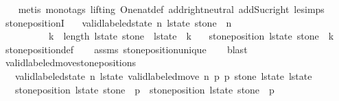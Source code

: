 \begin{isabellebody}
\ \ \isamarkupfalse%
\ {\isacharparenleft}metis\ {\isacharparenleft}mono{\isacharunderscore}tags{\isacharcomma}\ lifting{\isacharparenright}\ One{\isacharunderscore}nat{\isacharunderscore}def\ add{\isachardot}right{\isacharunderscore}neutral\ add{\isacharunderscore}Suc{\isacharunderscore}right\ le{\isacharunderscore}simps{\isacharparenleft}{}{\isacharparenright}{\isacharparenright}%
\endisatagproof
{\isafoldproof}%
%
\isadelimproof
\isanewline
%
\endisadelimproof
\isanewline
{}\isamarkupfalse%
\ stone{\isacharunderscore}positionI{\isacharcolon}\isanewline
\ \ \ {\isachardoublequoteopen}valid{\isacharunderscore}labeled{\isacharunderscore}state\ n\ l{\isacharunderscore}state{\isachardoublequoteclose}\ {\isachardoublequoteopen}stone\ {\isacharless}\ n{\isachardoublequoteclose}\ \isanewline
\ \ \ \ \ \ \ \ \ \ {\isachardoublequoteopen}k\ {\isacharless}\ length\ l{\isacharunderscore}state{\isachardoublequoteclose}\ {\isachardoublequoteopen}stone\ {\isasymin}\ l{\isacharunderscore}state\ {\isacharbang}\ k{\isachardoublequoteclose}\isanewline
\ \ \ {\isachardoublequoteopen}stone{\isacharunderscore}position\ l{\isacharunderscore}state\ stone\ {\isacharequal}\ k{\isachardoublequoteclose}\isanewline
%
\isadelimproof
\ \ %
\endisadelimproof
%
\isatagproof
{}\isamarkupfalse%
\ stone{\isacharunderscore}position{\isacharunderscore}def\isanewline
\ \ \isamarkupfalse%
\ assms\ stone{\isacharunderscore}position{\isacharunderscore}unique\isanewline
\ \ \isamarkupfalse%
\ blast%
\endisatagproof
{\isafoldproof}%
%
\isadelimproof
\isanewline
%
\endisadelimproof
\isanewline
{}\isamarkupfalse%
\ valid{\isacharunderscore}labeled{\isacharunderscore}move{\isacharprime}{\isacharunderscore}stone{\isacharunderscore}positions{\isacharcolon}\isanewline
\ \ \ {\isachardoublequoteopen}valid{\isacharunderscore}labeled{\isacharunderscore}state\ n\ l{\isacharunderscore}state{\isachardoublequoteclose}\ {\isachardoublequoteopen}valid{\isacharunderscore}labeled{\isacharunderscore}move{\isacharprime}\ n\ p{}\ p{}\ stone\ l{\isacharunderscore}state\ l{\isacharunderscore}state{\isacharprime}{\isachardoublequoteclose}\isanewline
\ \ \ {\isachardoublequoteopen}stone{\isacharunderscore}position\ l{\isacharunderscore}state\ stone\ {\isacharequal}\ p{}\ {\isasymand}\ stone{\isacharunderscore}position\ l{\isacharunderscore}state{\isacharprime}\ stone\ {\isacharequal}\ p{}{\isachardoublequoteclose}\isanewline

\end{isabellebody}
